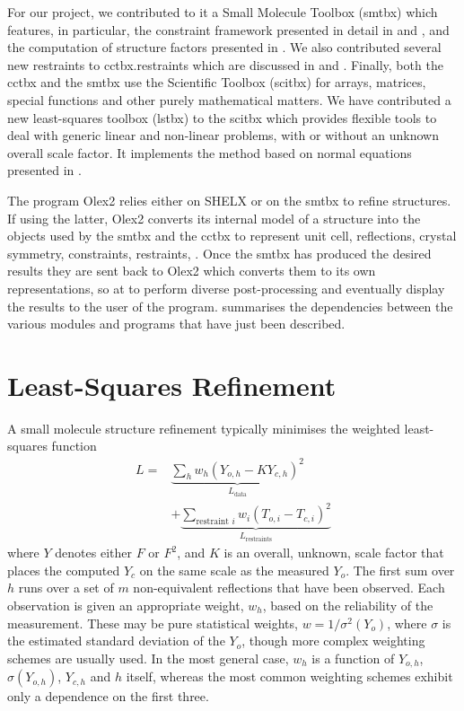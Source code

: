 \documentclass[pdf]{iucr}
\begin{document}
For our project, we contributed to it a Small Molecule Toolbox (smtbx) which features, in particular, the constraint framework presented in detail in  and , and the computation of structure factors presented in . We also contributed several new restraints to cctbx.restraints which are discussed in  and . Finally, both the cctbx and the smtbx use the Scientific Toolbox (scitbx) for arrays, matrices, special functions and other purely mathematical matters. We have contributed a new least-squares toolbox (lstbx) to the scitbx which provides flexible tools to deal with generic linear and non-linear problems, with or without an unknown overall scale factor. It implements the method based on normal equations presented in .

The program Olex2 relies either on SHELX or on the smtbx to refine structures. If using the latter, Olex2 converts its internal model of a structure into the objects used by the smtbx and the cctbx to represent unit cell, reflections, crystal symmetry, constraints, restraints, . Once the smtbx has produced the desired results they are sent back to Olex2 which converts them to its own representations, so at to perform diverse post-processing and eventually display the results to the user of the program.  summarises the dependencies between the various modules and programs that have just been described.  

\section{Least-Squares Refinement}
\newcommand{\data}{\text{data}}
\newcommand{\restraints}{\text{restraints}}

A small molecule structure refinement typically minimises the weighted least-squares function
\begin{equation}
\begin{split}
L = &\underbrace{\sum_h w_h \left( Y_{o,h} - K Y_{c,h} \right)^2}_{L_\data} \\
  &+ \underbrace{\sum_{\text{restraint } i} w_i \left( T_{o,i} - T_{c,i} \right)^2}_{L_\restraints}
\label{eqn:L:def}
\end{split}
\end{equation}
where $Y$ denotes either $F$ or $F^2$, and $K$ is an overall, unknown, scale factor that places the computed $Y_c$ on the same scale as the measured $Y_o$. The first sum over $h$ runs over a set of $m$ non-equivalent reflections that have been observed. Each observation is given an appropriate weight, $w_h$, based on the reliability of the measurement. These may be pure statistical weights, $w = 1/\sigma^2(Y_o)$, where $\sigma$ is the estimated standard deviation of the $Y_o$, though more complex weighting schemes are usually used. In the most general case, $w_h$ is a function of $Y_{o,h}$, $\sigma(Y_{o,h})$, $Y_{c,h}$ and $h$ itself, whereas the most common weighting schemes exhibit only a dependence on the first three.
\end{document}
